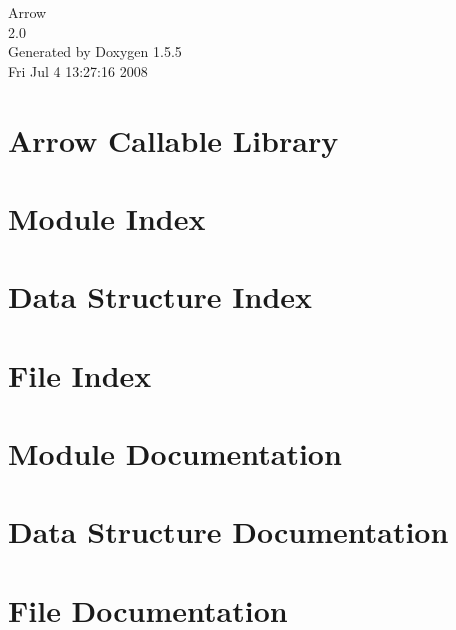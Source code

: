 \documentclass[a4paper]{book}
\begin{document}
\begin{titlepage}
\vspace*{7cm}
\begin{center}
{\Large Arrow \\[1ex]\large 2.0 }\\
\vspace*{1cm}
{\large Generated by Doxygen 1.5.5}\\
\vspace*{0.5cm}
{\small Fri Jul 4 13:27:16 2008}\\
\end{center}
\end{titlepage}
\clearemptydoublepage
{}
\tableofcontents
\clearemptydoublepage
{}
\chapter{Arrow Callable Library }
\label{index}\hypertarget{index}{}
\chapter{Module Index}

\chapter{Data Structure Index}

\chapter{File Index}

\chapter{Module Documentation}


\chapter{Data Structure Documentation}















\chapter{File Documentation}




























\printindex
\end{document}
